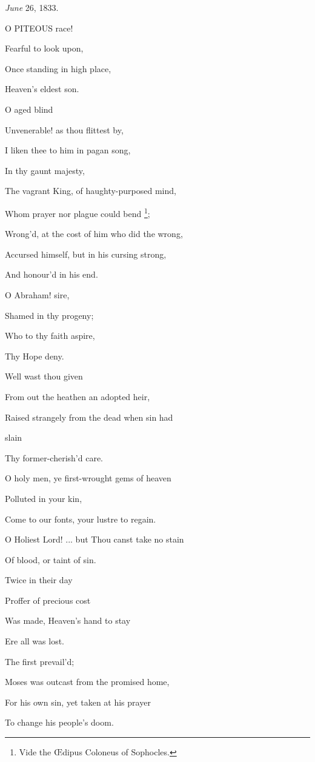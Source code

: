 \emph{June} 26, 1833.


O PITEOUS race!

Fearful to look upon,

Once standing in
high place,

Heaven's eldest son.

O
aged blind

Unvenerable! as thou flittest by,

I liken thee to him in pagan song,

In
thy gaunt majesty,

The vagrant King, of haughty-purposed mind,

Whom prayer nor plague could
bend \footnote{Vide the Œdipus Coloneus of Sophocles.};

Wrong'd, at the cost of him who did the wrong,

Accursed himself, but in his cursing strong,

And honour'd in his end.

O
Abraham! sire,

Shamed in thy progeny;

Who to thy faith aspire,

Thy
Hope deny.

Well
wast thou given

From out the heathen an adopted heir,

Raised strangely from the dead when sin had

slain

Thy former-cherish'd care.

O holy men, ye first-wrought gems of heaven

Polluted in your kin,

Come to our fonts, your lustre to regain.

O Holiest Lord! ... but Thou canst take no stain

Of
blood, or taint of sin.

Twice
in their day

Proffer of precious cost

Was made, Heaven's hand to
stay

Ere
all was lost.

The
first prevail'd;

Moses was outcast from the promised home,

For his own sin, yet taken at his prayer

To
change his people's doom.

